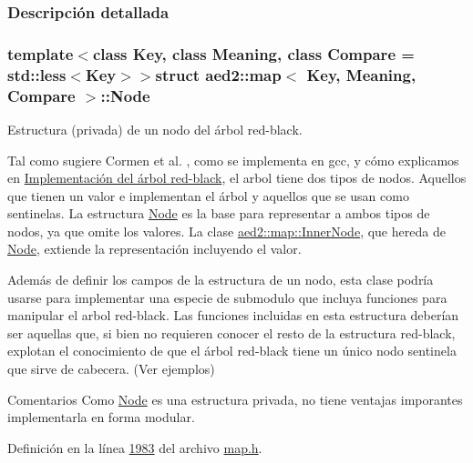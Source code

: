 \subsubsection{\-Descripción detallada}
\subsubsection*{template$<$class \-Key, class \-Meaning, class \-Compare = std\-::less$<$\-Key$>$$>$struct aed2\-::map$<$ Key, Meaning, Compare $>$\-::\-Node}

\-Estructura (privada) de un nodo del árbol red-\/black. 

\-Tal como sugiere \-Cormen et al. \cite{CormenLeisersonRivestStein2009}, como se implementa en gcc, y cómo explicamos en \hyperlink{Implementacion}{\-Implementación del árbol red-\/black}, el arbol tiene dos tipos de nodos. \-Aquellos que tienen un valor e implementan el árbol y aquellos que se usan como sentinelas. \-La estructura \hyperlink{structaed2_1_1map_1_1Node}{\-Node} es la base para representar a ambos tipos de nodos, ya que omite los valores. \-La clase \hyperlink{structaed2_1_1map_1_1InnerNode}{aed2\-::map\-::\-Inner\-Node}, que hereda de \hyperlink{structaed2_1_1map_1_1Node}{\-Node}, extiende la representación incluyendo el valor.

\-Además de definir los campos de la estructura de un nodo, esta clase podría usarse para implementar una especie de submodulo que incluya funciones para manipular el arbol red-\/black. \-Las funciones incluidas en esta estructura deberían ser aquellas que, si bien no requieren conocer el resto de la estructura red-\/black, explotan el conocimiento de que el árbol red-\/black tiene un único nodo sentinela que sirve de cabecera. (\-Ver ejemplos)

\begin{DoxyRemark}{\-Comentarios}
\-Como \hyperlink{structaed2_1_1map_1_1Node}{\-Node} es una estructura privada, no tiene ventajas imporantes implementarla en forma modular. 
\end{DoxyRemark}


\-Definición en la línea \hyperlink{map_8h_source_l01983}{1983} del archivo \hyperlink{map_8h_source}{map.\-h}.



